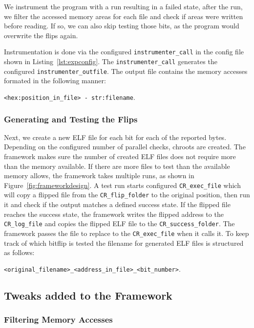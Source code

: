 We instrument the program with a run resulting in a failed state, after the run,
we filter the accessed memory areas for each file and check if areas were
written before reading. If so, we can also skip testing those bits, as the
program would overwrite the flips again.

Instrumentation is done via the configured \texttt{instrumenter\_call} in the
config file shown in Listing~\ref{lst:expconfig}. The
\texttt{instrumenter\_call} generates the configured
\texttt{instrumenter\_outfile}. The output file contains the memory accesses
formated in the following manner:

\mbox{\texttt{<hex:position\_in\_file> - str:filename}}.

\subsubsection{Generating and Testing the Flips}

Next, we create a new ELF file for each bit for each of the reported bytes.
Depending on the configured number of parallel checks, chroots are created. The
framework makes sure the number of created ELF files does not require more than
the memory available. If there are more files to test than the available memory
allows, the framework takes multiple runs, as shown in
Figure~\ref{fig:frameworkdesign}. A test run starts configured
\texttt{CR\_exec\_file} which will copy a flipped file from the
\texttt{CR\_flip\_folder} to the original position, then run it and check if the
output matches a defined success state. If the flipped file reaches the success
state, the framework writes the flipped address to the \texttt{CR\_log\_file}
and copies the flipped ELF file to the \texttt{CR\_success\_folder}. The
framework passes the file to replace to the \texttt{CR\_exec\_file} when it
calls it. To keep track of which bitflip is tested the filename for generated
ELF files is structured as follows:

\mbox{\texttt{<original\_filename>\_<address\_in\_file>\_<bit\_number>}}.


\subsection{Tweaks added to the Framework}

\subsubsection{Filtering Memory Accesses}

